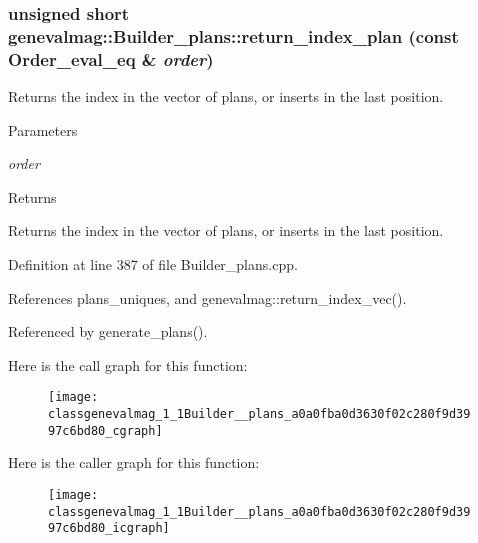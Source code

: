 \hypertarget{classgenevalmag_1_1Builder__plans_a0a0fba0d3630f02c280f9d3997c6bd80}{
\subsubsection[{return\_\-index\_\-plan}]{\setlength{\rightskip}{0pt plus 5cm}unsigned short genevalmag::Builder\_\-plans::return\_\-index\_\-plan (const {\bf Order\_\-eval\_\-eq} \& {\em order})}}
\label{classgenevalmag_1_1Builder__plans_a0a0fba0d3630f02c280f9d3997c6bd80}
Returns the index in the vector of plans, or inserts in the last position. 
\begin{DoxyParams}{Parameters}
\item[{\em order}]\end{DoxyParams}
\begin{DoxyReturn}{Returns}

\end{DoxyReturn}
Returns the index in the vector of plans, or inserts in the last position. 

Definition at line 387 of file Builder\_\-plans.cpp.



References plans\_\-uniques, and genevalmag::return\_\-index\_\-vec().



Referenced by generate\_\-plans().



Here is the call graph for this function:\nopagebreak
\begin{figure}[H]
\begin{center}
\leavevmode
\texttt{[image: classgenevalmag\_1\_1Builder\_\_plans\_a0a0fba0d3630f02c280f9d3997c6bd80\_cgraph]}
\end{center}
\end{figure}




Here is the caller graph for this function:\nopagebreak
\begin{figure}[H]
\begin{center}
\leavevmode
\texttt{[image: classgenevalmag\_1\_1Builder\_\_plans\_a0a0fba0d3630f02c280f9d3997c6bd80\_icgraph]}
\end{center}
\end{figure}


